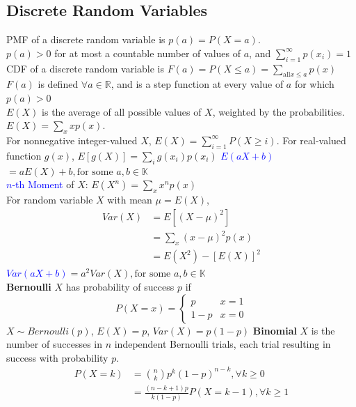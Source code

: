 \subsection{Discrete Random Variables}
PMF of a discrete random variable is \(p(a)=P(X=a)\).\\
$p(a)>0$ for at most a countable number of values of \(a\), and $\sum\limits_{i=1}^{\infty}p(x_i)=1$\\
CDF of a discrete random variable is $F(a)=P(X\le a)=\sum\limits_{\text{all}x\le a}p(x)$
$F(a)$ is defined $\forall a\in\mathbb{R}$, and is a step function at every
value of $a$ for which $p(a)>0$\\
\(E(X)\) is the average of all possible values of \(X\), weighted by the
probabilities. $E(X)=\sum\limits_{x}xp(x)$.\\
For nonnegative integer-valued $X$, $E(X)=\sum\limits_{i=1}^{\infty}P(X\ge i)$.
For real-valued function $g(x)$, $E[g(X)]=\sum\limits_{i}g(x_i)p(x_i)$
\textcolor{Blue}{$E(aX+b)$}$=aE(X)+b, \text{for some }a,b\in \mathbb{K}$\\
\textcolor{Blue}{$n$-th Moment} of \(X\): $E(X^n)= \sum\limits_{x}x^{n}p(x)$\\
For random variable $X$ with mean $\mu=E(X)$,\\
\begin{equation*}
\begin{split}
  Var(X)&=E[{(X-\mu)}^2]\\
        &=\sum\limits_{x}{(x-\mu)}^{2}p(x)\\
        &= E(X^2) - {[E(X)]}^2
\end{split}
\end{equation*}
\textcolor{Blue}{\(Var(aX+b)\)}\(=a^2Var(X), \text{for some }a,b\in \mathbb{K} \)\\
\textbf{Bernoulli} $X$ has probability of
success \(p\) if
\[
P(X = x) = 
\begin{cases}
	p & x=1\\
	1-p & x=0
\end{cases}
\]
$X\sim Bernoulli(p)$, $E(X) = p$, $Var(X) = p(1-p)$
\textbf{Binomial} $X$ is the number of successes in $n$
independent Bernoulli trials, each trial resulting in success with probability
\(p\).
\begin{equation*}
\begin{split}
  P(X=k)&=\binom{n}{k}p^k{(1-p)}^{n-k}, \forall k\ge0\\
        &=\frac{(n-k+1)p}{k(1-p)}P(X=k-1), \forall k\ge1
\end{split}
\end{equation*}
